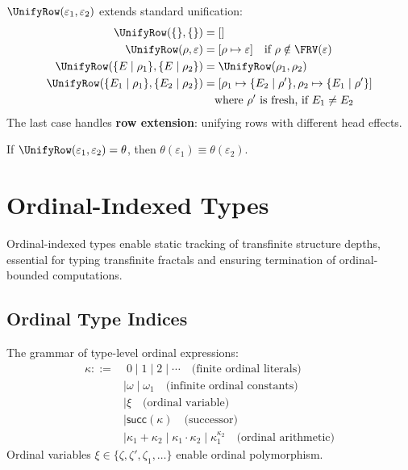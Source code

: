 \begin{definition}
\label{def:row-unify}
$\UnifyRow(\varepsilon_1, \varepsilon_2)$ extends standard unification:
\begin{align}
\UnifyRow(\{\}, \{\}) &= [] \\
\UnifyRow(\rho, \varepsilon) &= [\rho \mapsto \varepsilon] \quad \text{if } \rho \notin \FRV(\varepsilon) \\
\UnifyRow(\{E \mid \rho_1\}, \{E \mid \rho_2\}) &= \UnifyRow(\rho_1, \rho_2) \\
\UnifyRow(\{E_1 \mid \rho_1\}, \{E_2 \mid \rho_2\}) &= [\rho_1 \mapsto \{E_2 \mid \rho'\}, \rho_2 \mapsto \{E_1 \mid \rho'\}] \\
    &\quad \text{where } \rho' \text{ is fresh, if } E_1 \neq E_2
\end{align}
The last case handles \textbf{row extension}: unifying rows with different head effects.
\end{definition}

\begin{theorem}
\label{thm:row-unify-sound}
If $\UnifyRow(\varepsilon_1, \varepsilon_2) = \theta$, then $\theta(\varepsilon_1) \equiv \theta(\varepsilon_2)$.
\end{theorem}

\section{Ordinal-Indexed Types}
\label{sec:ordinal-indexed-types}

Ordinal-indexed types enable static tracking of transfinite structure depths, essential for typing transfinite fractals and ensuring termination of ordinal-bounded computations.

\subsection{Ordinal Type Indices}
\label{subsec:ordinal-indices}

\begin{definition}
\label{def:type-level-ordinals}
The grammar of type-level ordinal expressions:
\begin{align}
\kappa ::=&\; 0 \mid 1 \mid 2 \mid \cdots \quad \text{(finite ordinal literals)} \\
    &\mid \omega \mid \omega_1 \quad \text{(infinite ordinal constants)} \\
    &\mid \xi \quad \text{(ordinal variable)} \\
    &\mid \mathsf{succ}(\kappa) \quad \text{(successor)} \\
    &\mid \kappa_1 + \kappa_2 \mid \kappa_1 \cdot \kappa_2 \mid \kappa_1^{\kappa_2} \quad \text{(ordinal arithmetic)}
\end{align}
Ordinal variables $\xi \in \{\zeta, \zeta', \zeta_1, \ldots\}$ enable ordinal polymorphism.
\end{definition}

